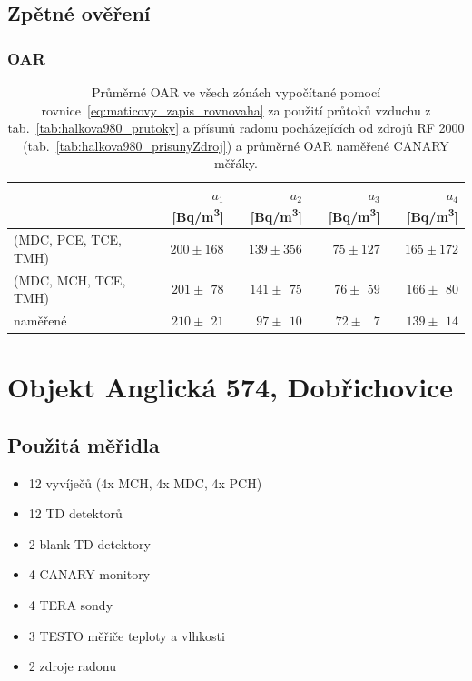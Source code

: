 \subsection{Zpětné ověření}

\subsubsection{OAR}
\begin{table}[H]
    \centering
    \caption{Průměrné OAR ve všech zónách vypočítané pomocí rovnice~\eqref{eq:maticovy_zapis_rovnovaha} za použití průtoků vzduchu z tab.~\ref{tab:halkova980_prutoky} a přísunů radonu pocházejících od zdrojů RF 2000 (tab.~\ref{tab:halkova980_prisunyZdroj}) a průměrné OAR naměřené CANARY měřáky.}
    \label{tab:halkova980_OAR_zpetne}
    \begin{tabular}{lrrrr}
        \toprule
        & $a_1$ [\si{Bq/m^3}] &  $a_2$ [\si{Bq/m^3}]& $a_3$ [\si{Bq/m^3}]& $a_4$ [\si{Bq/m^3}]\\
        \midrule
(MDC, PCE, TCE, TMH) & $200\pm168$          &$139\pm356$     &$75\pm127$       &$165\pm172$ \\
(MDC, MCH, TCE, TMH) & $201\pm\ \,78$       &$ 141\pm\ \,75$ &$76\pm\ \,59$    &$ 166\pm\ \,80$ \\
\midrule
       naměřené      & $210\pm\ \,21$       & $97\pm\ \,10$  &$72\pm\ \,\ \,7$ &$139\pm\ \,14$\\
        \bottomrule
    \end{tabular}
\end{table}

\section{Objekt Anglická 574, Dobřichovice}

\subsection{Použitá měřidla}
\begin{itemize}
    \setlength\itemsep{0em}
	\item 12 vyvíječů (4x MCH, 4x MDC, 4x PCH)
	\item 12 TD detektorů
	\item 2 blank TD detektory 
	\item 4 CANARY monitory
	\item 4 TERA sondy
	\item 3 TESTO měřiče teploty a vlhkosti
	\item 2 zdroje radonu
\end{itemize}

